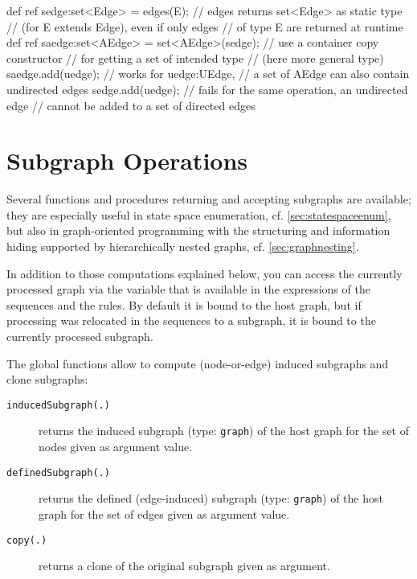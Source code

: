 \begin{example}
\begin{grgen}
def ref sedge:set<Edge> = edges(E); // edges returns set<Edge> as static type
                                    // (for E extends Edge), even if only edges 
                                    // of type E are returned at runtime
def ref saedge:set<AEdge> = set<AEdge>(sedge); // use a container copy constructor 
                                               // for getting a set of intended type
                                               // (here more general type)
saedge.add(uedge); // works for uedge:UEdge, 
                   // a set of AEdge can also contain undirected edges
sedge.add(uedge); // fails for the same operation, an undirected edge 
                  // cannot be added to a set of directed edges
\end{grgen}
\end{example}

\section{Subgraph Operations}\label{sec:subgraphop}

Several functions and procedures returning and accepting subgraphs are available;
they are especially useful in state space enumeration, cf. \ref{sec:statespaceenum}, but also in graph-oriented programming with the structuring and information hiding supported by hierarchically nested graphs, cf. \ref{sec:graphnesting}.

In addition to those computations explained below, you can access the currently processed graph via the  \texttt{} variable that is available in the expressions of the sequences and the rules. 
By default it is bound to the host graph, but if processing was relocated in the sequences to a subgraph, it is bound to the currently processed subgraph.

The global functions allow to compute (node-or-edge) induced subgraphs and clone subgraphs:

\begin{description}
\item[\texttt{inducedSubgraph(.)}] returns the induced subgraph (type: \texttt{graph}) of the host graph for the set of nodes given as argument value.
\item[\texttt{definedSubgraph(.)}] returns the defined (edge-induced) subgraph (type: \texttt{graph}) of the host graph for the set of edges given as argument value.
\item[\texttt{copy(.)}] returns a clone of the original subgraph given as argument.
\end{description}

